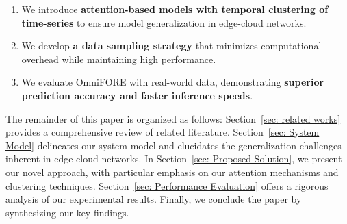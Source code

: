 \begin{enumerate}
\item We introduce \textbf{attention-based models with temporal clustering of time-series} to ensure model generalization in edge-cloud networks.
\item We develop \textbf{a data sampling strategy} that minimizes computational overhead while maintaining high performance.
\item We evaluate OmniFORE with real-world data, demonstrating \textbf{superior prediction accuracy and faster inference speeds}.
\end{enumerate}

The remainder of this paper is organized as follows: Section~\ref{sec: related works} provides a comprehensive review of related literature. Section~\ref{sec: System Model} delineates our system model and elucidates the generalization challenges inherent in edge-cloud networks. In Section~\ref{sec: Proposed Solution}, we present our novel approach, with particular emphasis on our attention mechanisms and clustering techniques. Section~\ref{sec: Performance Evaluation} offers a rigorous analysis of our experimental results. Finally, we conclude the paper by synthesizing our key findings.

